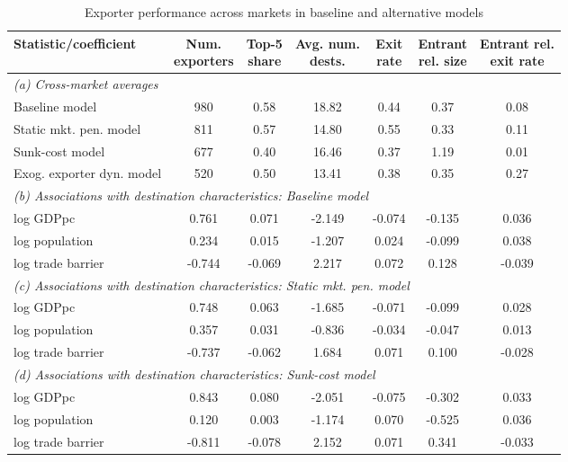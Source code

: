 \begin{table}[h!]
\footnotesize
\renewcommand{\arraystretch}{1.2}
\begin{center}
\caption{Exporter performance across markets in baseline and alternative models}
\label{tab:sumstats_regs_models}
\begin{tabular}{lcccccc}\toprule
Statistic/coefficient& \makecell{Num.\\exporters}& \makecell{Top-5\\share}& \makecell{Avg. num.\\dests.}& \makecell{Exit\\rate}& \makecell{Entrant\\rel. size}& \makecell{Entrant rel.\\exit rate}\\
\midrule
\multicolumn{7}{l}{\textit{(a) Cross-market averages}}\\
Baseline model& 980& 0.58& 18.82& 0.44& 0.37& 0.08\\
Static mkt. pen. model& 811& 0.57& 14.80& 0.55& 0.33& 0.11\\
Sunk-cost model& 677& 0.40& 16.46& 0.37& 1.19& 0.01\\
Exog. exporter dyn. model& 520& 0.50& 13.41& 0.38& 0.35& 0.27\\
\midrule\multicolumn{7}{l}{\textit{(b) Associations with destination characteristics: Baseline model}}\\
log GDPpc& 0.761& 0.071& -2.149& -0.074& -0.135& 0.036\\
log population& 0.234& 0.015& -1.207& 0.024& -0.099& 0.038\\
log trade barrier& -0.744& -0.069& 2.217& 0.072& 0.128& -0.039\\
\midrule\multicolumn{7}{l}{\textit{(c) Associations with destination characteristics: Static mkt. pen. model}}\\
log GDPpc& 0.748& 0.063& -1.685& -0.071& -0.099& 0.028\\
log population& 0.357& 0.031& -0.836& -0.034& -0.047& 0.013\\
log trade barrier& -0.737& -0.062& 1.684& 0.071& 0.100& -0.028\\
\midrule\multicolumn{7}{l}{\textit{(d) Associations with destination characteristics: Sunk-cost model}}\\
log GDPpc& 0.843& 0.080& -2.051& -0.075& -0.302& 0.033\\
log population& 0.120& 0.003& -1.174& 0.070& -0.525& 0.036\\
log trade barrier& -0.811& -0.078& 2.152& 0.071& 0.341& -0.033\\

\end{tabular}
\end{center}
\end{table}
